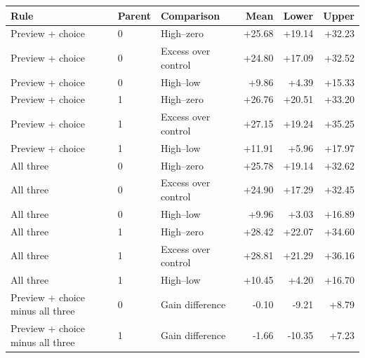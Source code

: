 \begin{tabular}{lllrrr}
\toprule
Rule & Parent & Comparison & Mean & Lower & Upper \\
\midrule
Preview + choice & 0 & High--zero & +25.68 & +19.14 & +32.23 \\
Preview + choice & 0 & Excess over control & +24.80 & +17.09 & +32.52 \\
Preview + choice & 0 & High--low & +9.86 & +4.39 & +15.33 \\
Preview + choice & 1 & High--zero & +26.76 & +20.51 & +33.20 \\
Preview + choice & 1 & Excess over control & +27.15 & +19.24 & +35.25 \\
Preview + choice & 1 & High--low & +11.91 & +5.96 & +17.97 \\
All three & 0 & High--zero & +25.78 & +19.14 & +32.62 \\
All three & 0 & Excess over control & +24.90 & +17.29 & +32.45 \\
All three & 0 & High--low & +9.96 & +3.03 & +16.89 \\
All three & 1 & High--zero & +28.42 & +22.07 & +34.60 \\
All three & 1 & Excess over control & +28.81 & +21.29 & +36.16 \\
All three & 1 & High--low & +10.45 & +4.20 & +16.70 \\
Preview + choice minus all three & 0 & Gain difference & -0.10 & -9.21 & +8.79 \\
Preview + choice minus all three & 1 & Gain difference & -1.66 & -10.35 & +7.23 \\
\bottomrule
\end{tabular}
